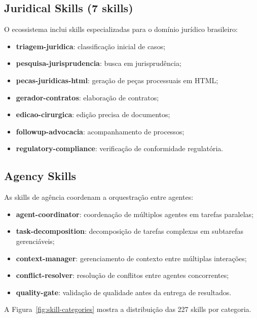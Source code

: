 \subsection{Juridical Skills (7 skills)}
\label{subsec:juridical-skills}

O ecossistema inclui skills especializadas para o domínio jurídico
brasileiro:

\begin{itemize}
\item \textbf{triagem-juridica}: classificação inicial de casos;
\item \textbf{pesquisa-jurisprudencia}: busca em jurisprudência;
\item \textbf{pecas-juridicas-html}: geração de peças processuais em HTML;
\item \textbf{gerador-contratos}: elaboração de contratos;
\item \textbf{edicao-cirurgica}: edição precisa de documentos;
\item \textbf{followup-advocacia}: acompanhamento de processos;
\item \textbf{regulatory-compliance}: verificação de conformidade
regulatória.
\end{itemize}

\subsection{Agency Skills}
\label{subsec:agency-skills}

As skills de agência coordenam a orquestração entre agentes:

\begin{itemize}
\item \textbf{agent-coordinator}: coordenação de múltiplos agentes em
tarefas paralelas;
\item \textbf{task-decomposition}: decomposição de tarefas complexas
em subtarefas gerenciáveis;
\item \textbf{context-manager}: gerenciamento de contexto entre
múltiplas interações;
\item \textbf{conflict-resolver}: resolução de conflitos entre
agentes concorrentes;
\item \textbf{quality-gate}: validação de qualidade antes da entrega
de resultados.
\end{itemize}

A Figura~\ref{fig:skill-categories} mostra a distribuição das 227
skills por categoria.


